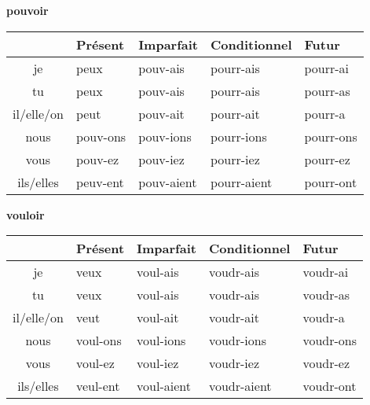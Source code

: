 \renewcommand{\stemPresent}{pouv}
\renewcommand{\stemFutur}{pourr}
\begin{center}
\textbf{pouvoir}
\vskip 0.1cm
\begin{tabular}{|c||L{3cm}|L{3cm}|L{3cm}|L{3cm}|}
\hline
& Pr\'esent & Imparfait & Conditionnel & Futur \\
\hline\hline
je           &	{\color{red}peu}x 	&	\stemPresent-ais	&	\stemFutur-ais	 &	\stemFutur-ai	\\
tu           &	{\color{red}peu}x	&	\stemPresent-ais	&	\stemFutur-ais	&	\stemFutur-as	\\
il/elle/on &	{\color{red}peu}t		&	\stemPresent-ait	&	\stemFutur-ait	&	\stemFutur-a	\\
nous      &	\stemPresent-ons	&	\stemPresent-ions	&	\stemFutur-ions	&	\stemFutur-ons	\\
vous      &	\stemPresent-ez	&	\stemPresent-iez	&	\stemFutur-iez		&	\stemFutur-ez	\\
ils/elles  &	{\color{red}peuv}-ent	&	\stemPresent-aient	&	\stemFutur-aient	&	\stemFutur-ont	\\
\hline
\end{tabular}
\end{center}

\renewcommand{\stemPresent}{voul}
\renewcommand{\stemFutur}{voudr}
\begin{center}
\textbf{vouloir}
\vskip 0.1cm
\begin{tabular}{|c||L{3cm}|L{3cm}|L{3cm}|L{3cm}|}
\hline
& Pr\'esent & Imparfait & Conditionnel & Futur \\
\hline\hline
je           &	{\color{red}veu}x 	&	\stemPresent-ais	&	\stemFutur-ais	 &	\stemFutur-ai	\\
tu           &	{\color{red}veu}x	&	\stemPresent-ais	&	\stemFutur-ais	&	\stemFutur-as	\\
il/elle/on &	{\color{red}veu}t		&	\stemPresent-ait	&	\stemFutur-ait	&	\stemFutur-a	\\
nous      &	\stemPresent-ons	&	\stemPresent-ions	&	\stemFutur-ions	&	\stemFutur-ons	\\
vous      &	\stemPresent-ez	&	\stemPresent-iez	&	\stemFutur-iez		&	\stemFutur-ez	\\
ils/elles  &	{\color{red}veul}-ent	&	\stemPresent-aient	&	\stemFutur-aient	&	\stemFutur-ont	\\
\hline
\end{tabular}
\end{center}

